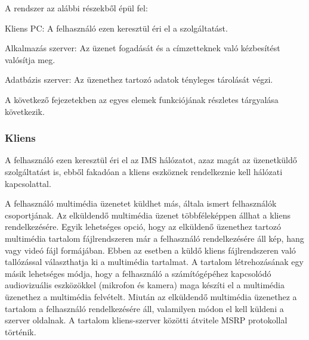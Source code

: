 A rendszer az alábbi részekből épül fel:
\begin{mydescription}
\item[Kliens PC:] A felhasználó ezen keresztül éri el a szolgáltatást.
\item[Alkalmazás szerver:] Az üzenet fogadását és a címzetteknek való kézbesítést valósítja meg.
\item[Adatbázis szerver:] Az üzenethez tartozó adatok tényleges tárolását végzi.
\end{mydescription}

A következő fejezetekben az egyes elemek funkciójának részletes tárgyalása következik.

\subsubsection{Kliens}
\label{sec:kliens_pc}

A felhasználó ezen keresztül éri el az IMS hálózatot, azaz magát az üzenetküldő szolgáltatást is, ebből fakadóan a kliens eszköznek rendelkeznie kell hálózati kapcsolattal.

A felhasználó multimédia üzenetet küldhet más, általa ismert felhasználók csoportjának. Az elküldendő multimédia üzenet többféleképpen állhat a kliens rendelkezésére. Egyik lehetséges opció, hogy az elküldenő üzenethez tartozó multimédia tartalom fájlrendszeren már a felhasználó rendelkezésére áll kép, hang vagy videó fájl formájában. Ebben az esetben a küldő kliens fájlrendszeren való tallózással választhatja ki a multimédia tartalmat. A tartalom létrehozásának egy másik lehetséges módja, hogy a felhasználó a számítógépéhez kapcsolódó audiovizuális eszközökkel (mikrofon és kamera) maga készíti el a multimédia üzenethez a multimédia felvételt. Miután az elküldendő multimédia üzenethez a tartalom a felhasználó rendelkezésére áll, valamilyen módon el kell küldeni a szerver oldalnak. A tartalom kliens-szerver közötti átvitele MSRP protokollal történik.

